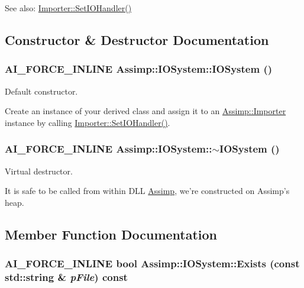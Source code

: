 \begin{Desc}
\item[See also:]\hyperlink{class_assimp_1_1_importer_1161f46318af18bb86dfe0fc3edea4df}{Importer::SetIOHandler()} \end{Desc}


\subsection{Constructor \& Destructor Documentation}
\hypertarget{class_assimp_1_1_i_o_system_f8ba1ee2dc0686da8fc9e3dad49af801}{
\subsubsection[IOSystem]{\setlength{\rightskip}{0pt plus 5cm}AI\_\-FORCE\_\-INLINE Assimp::IOSystem::IOSystem ()}}
\label{class_assimp_1_1_i_o_system_f8ba1ee2dc0686da8fc9e3dad49af801}


Default constructor. 

Create an instance of your derived class and assign it to an \hyperlink{class_assimp_1_1_importer}{Assimp::Importer} instance by calling \hyperlink{class_assimp_1_1_importer_1161f46318af18bb86dfe0fc3edea4df}{Importer::SetIOHandler()}. \hypertarget{class_assimp_1_1_i_o_system_617417f1c5125770606fea3b41068b36}{
\subsubsection[$\sim$IOSystem]{\setlength{\rightskip}{0pt plus 5cm}AI\_\-FORCE\_\-INLINE Assimp::IOSystem::$\sim$IOSystem ()}}
\label{class_assimp_1_1_i_o_system_617417f1c5125770606fea3b41068b36}


Virtual destructor. 

It is safe to be called from within DLL \hyperlink{namespace_assimp}{Assimp}, we're constructed on Assimp's heap. 

\subsection{Member Function Documentation}
\hypertarget{class_assimp_1_1_i_o_system_7ae6cfaea4957408967463bfc3b84b27}{
\subsubsection[Exists]{\setlength{\rightskip}{0pt plus 5cm}AI\_\-FORCE\_\-INLINE bool Assimp::IOSystem::Exists (const std::string \& {\em pFile}) const}}
\label{class_assimp_1_1_i_o_system_7ae6cfaea4957408967463bfc3b84b27}


